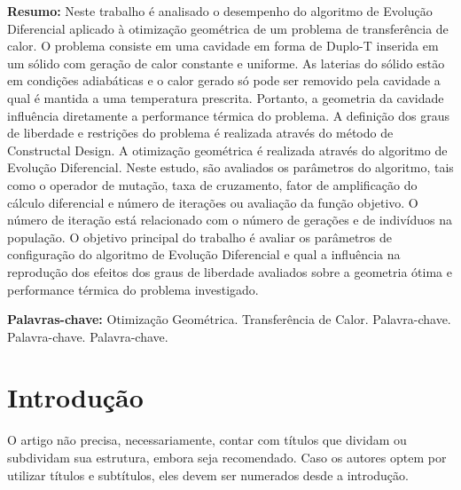 \documentclass[12pt,A4,A4pt]{article}
\begin{document}
\begin{flushleft}
{\small {} \justify
\textbf{Resumo:} Neste trabalho é analisado o desempenho do algoritmo de Evolução Diferencial aplicado à otimização geométrica de um problema de transferência de calor. O problema consiste em uma cavidade em forma de Duplo-T inserida em um sólido com geração de calor constante e uniforme. As laterias do sólido estão em condições adiabáticas e o calor gerado só pode ser removido pela cavidade a qual é mantida a uma temperatura prescrita. Portanto, a geometria da cavidade influência diretamente a performance térmica do problema. A definição dos graus de liberdade e restrições do problema é realizada através do método de Constructal Design. A otimização geométrica é realizada através do algoritmo de Evolução Diferencial. Neste estudo, são avaliados os parâmetros do algoritmo, tais como o operador de mutação, taxa de cruzamento, fator de amplificação do cálculo diferencial e número de iterações ou avaliação da função objetivo. O número de iteração está relacionado com o número de gerações e de indivíduos na população. O objetivo principal do trabalho é avaliar os parâmetros de configuração do algoritmo de Evolução Diferencial e qual a influência na reprodução dos efeitos dos graus de liberdade avaliados sobre a geometria ótima e performance térmica do problema investigado.

\vspace{0.3cm}

\noindent\textbf{Palavras-chave:} Otimização Geométrica. Transferência de Calor. Palavra-chave. Palavra-chave. Palavra-chave.}
\end{flushleft}




\newpage
 \onehalfspacing
\section{Introdução}

 {\fontsize{12pt}{\baselineskip}\selectfont}
 
\hspace{0.5cm}O artigo não precisa, necessariamente, contar com títulos que dividam ou subdividam sua estrutura, embora seja recomendado. Caso os autores optem por utilizar títulos e subtítulos, eles devem ser numerados desde a introdução.
\end{document}
